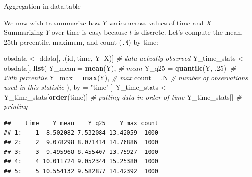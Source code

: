 \documentclass[10pt,ignorenonframetext,]{beamer}
\newenvironment{Shaded}{\begin{snugshade}}{\end{snugshade}}
\newcommand{\KeywordTok}[1]{\textcolor[rgb]{0.13,0.29,0.53}{\textbf{{#1}}}}
\newcommand{\DataTypeTok}[1]{\textcolor[rgb]{0.13,0.29,0.53}{{#1}}}
\newcommand{\DecValTok}[1]{\textcolor[rgb]{0.00,0.00,0.81}{{#1}}}
\newcommand{\StringTok}[1]{\textcolor[rgb]{0.31,0.60,0.02}{{#1}}}
\newcommand{\CommentTok}[1]{\textcolor[rgb]{0.56,0.35,0.01}{\textit{{#1}}}}
\newcommand{\NormalTok}[1]{{#1}}
\begin{document}
\begin{frame}[fragile]{Aggregation in data.table}

We now wish to summarize how \(Y\) varies across values of time and
\(X\). Summarizing \(Y\) over time is easy because \(t\) is discrete.
Let's compute the mean, 25th percentile, maximum, and count
(\texttt{.N}) by time:

\footnotesize

\begin{Shaded}
\begin{Highlighting}[]
\NormalTok{obsdata <-}\StringTok{ }\NormalTok{ddata[, .(id, time, Y, X)] }\CommentTok{# data actually observed}
\NormalTok{Y_time_stats <-}\StringTok{ }\NormalTok{obsdata[,}
  \KeywordTok{list}\NormalTok{(}
    \DataTypeTok{Y_mean =} \KeywordTok{mean}\NormalTok{(Y), }\CommentTok{# mean}
    \DataTypeTok{Y_q25 =} \KeywordTok{quantile}\NormalTok{(Y, .}\DecValTok{25}\NormalTok{), }\CommentTok{# 25th percentile}
    \DataTypeTok{Y_max =} \KeywordTok{max}\NormalTok{(Y), }\CommentTok{# max}
    \DataTypeTok{count =} \NormalTok{.N }\CommentTok{# number of observations used in this statistic}
  \NormalTok{),}
  \NormalTok{by =}\StringTok{ "time"}
\NormalTok{]}
\NormalTok{Y_time_stats <-}\StringTok{ }\NormalTok{Y_time_stats[}\KeywordTok{order}\NormalTok{(time)] }\CommentTok{# putting data in order of time}
\NormalTok{Y_time_stats[] }\CommentTok{# printing}
\end{Highlighting}
\end{Shaded}

\begin{verbatim}
##    time    Y_mean    Y_q25    Y_max count
## 1:    1  8.502082 7.532084 13.42059  1000
## 2:    2  9.078298 8.071414 14.76886  1000
## 3:    3  9.495968 8.455407 13.75927  1000
## 4:    4 10.011724 9.052344 15.25380  1000
## 5:    5 10.554132 9.582877 14.42392  1000
\end{verbatim}

\normalsize

\end{frame}
\end{document}
